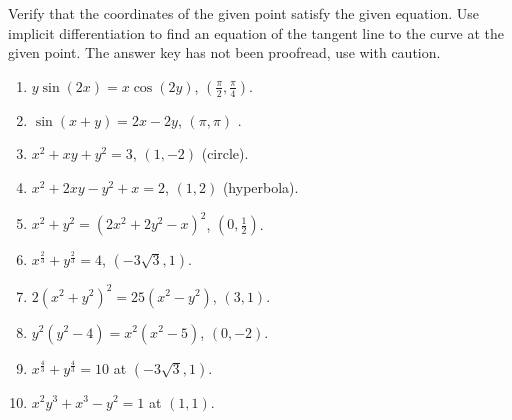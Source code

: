 Verify that the coordinates of the given point satisfy the given equation. Use implicit differentiation to find an equation of the tangent line to the curve at the given point. 
The answer key has not been proofread, use with caution.
\begin{multicols}{3}
\begin{enumerate}[ref={\fcProblemRef}]
\item \label{problemImplicitTangentysin(2x)=xcos(2y)point(pi/2,pi/4)} $y\sin (2x)=x\cos (2y) $, $\left(\frac{\pi}{2}, \frac{\pi}{4}\right)$. 

\item $ \sin (x+y)=2x-2y$, $(\pi,\pi)$ . 

\item $x^2+x y+y^2=3 $, $(1,-2)$ (circle). 

\item $x^2+2x y-y^2+x=2 $, $(1,2)$ (hyperbola). 

\item $x^2+y^2=(2x^2+2y^2-x)^2 $, $(0,\frac{1}{2})$. 

\item $x^{\frac{2}{3}}+y^{\frac{2}{3}}=4$, $(-3\sqrt{3},1)$. 

\item $2(x^2+y^2)^2 =25(x^2-y^2)$, $(3,1)$. 

\item $y^2(y^2-4)=x^2(x^2-5) $, $(0,-2)$. 

\item $x^{\frac{4}{3}}+y^{\frac{4}{3}}=10$ at $(-3\sqrt{3}, 1)$. 

\item $x^2y^3+x^3-y^2=1$ at $(1,1)$. 

\end{enumerate}
\end{multicols}
